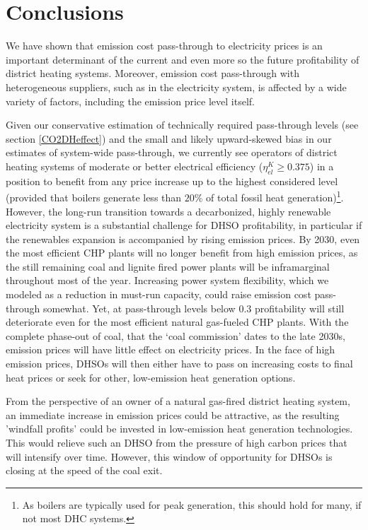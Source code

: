 \documentclass[preprint, 12pt, authoryear]{elsarticle}
\begin{document}
\section{Conclusions} \label{sec_conclude}
We have shown that emission cost pass-through to electricity prices is an important determinant of the current and even more so the future profitability of district heating systems. Moreover, emission cost pass-through with heterogeneous suppliers, such as in the electricity system, is affected by a wide variety of factors, including the emission price level itself.

Given our conservative estimation of technically required pass-through levels (see section \ref{CO2DHeffect}) and the small and likely upward-skewed bias in our estimates of system-wide pass-through, we currently see operators of district heating systems of moderate or better electrical efficiency ($\eta_{el}^{K} \geq 0.375$) in a position to benefit from any  price increase up to the highest considered level (provided that boilers generate less than $20\%$ of total fossil heat generation)\footnote{As boilers are typically used for peak generation, this should hold for many, if not most DHC systems.}.
However, the long-run transition towards a decarbonized, highly renewable electricity system is a substantial challenge for DHSO profitability, in particular if the renewables expansion is accompanied by rising  emission prices.
By 2030, even the most efficient CHP plants will no longer benefit from high emission prices, as the still remaining coal and lignite fired power plants will be inframarginal throughout most of the year. Increasing power system flexibility, which we modeled as a reduction in must-run capacity, could raise emission cost pass-through somewhat. Yet, at pass-through levels below $0.3$ profitability will still deteriorate even for the most efficient natural gas-fueled CHP plants. 
With the complete phase-out of coal, that the ‘coal commission’ dates to the late 2030s, emission prices will have little effect on electricity prices. In the face of high emission prices, DHSOs will then either have to pass on increasing costs to final heat prices or seek for other, low-emission heat generation options.

From the perspective of an owner of a natural gas-fired district heating system, an immediate increase in emission prices could be attractive, as the resulting 'windfall profits' could be invested in low-emission heat generation technologies. 
This would relieve such an DHSO from the pressure of high carbon prices that will intensify over time. 
However, this window of opportunity for DHSOs is closing at the speed of the coal exit.
\end{document}
